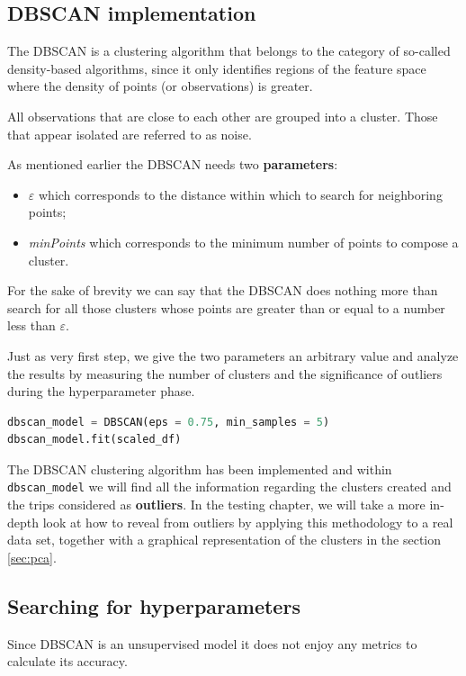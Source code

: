 \subsection{DBSCAN implementation}
The DBSCAN is a clustering algorithm that belongs to the category of so-called density-based algorithms, since it only identifies regions of the feature space where the density of points (or observations) is greater.

All observations that are close to each other are grouped into a cluster. Those that appear isolated are referred to as noise.

As mentioned earlier the DBSCAN needs two \textbf{parameters}:

\begin{itemize}
\item $\varepsilon$ which corresponds to the distance within which to search for neighboring points;
\item \textit{minPoints} which corresponds to the minimum number of points to compose a cluster.
\end{itemize}

For the sake of brevity we can say that the DBSCAN does nothing more than search for all those clusters whose points are greater than or equal to a number less than $\varepsilon$.

Just as very first step, we give the two parameters an arbitrary value and analyze the results by measuring the number of clusters and the significance of outliers during the hyperparameter phase.

\begin{lstlisting}[language=Python]
dbscan_model = DBSCAN(eps = 0.75, min_samples = 5)
dbscan_model.fit(scaled_df)
\end{lstlisting}

The DBSCAN clustering algorithm has been implemented and within \verb|dbscan_model| we will find all the information regarding the clusters created and the trips considered as \textbf{outliers}. In the testing chapter, we will take a more in-depth look at how to reveal from outliers by applying this methodology to a real data set, together with a graphical representation of the clusters in the section \ref{sec:pca}.

\subsection{Searching for hyperparameters}
\label{sec:tuning}

Since DBSCAN is an unsupervised model it does not enjoy any metrics to calculate its accuracy.

